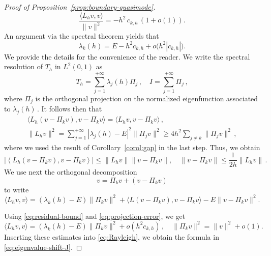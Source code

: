 \documentclass[11pt]{amsart}
\numberwithin{equation}{section}
\theoremstyle{remark}
\begin{document}
\begin{proof}[Proof of Proposition~\ref{prop:boundary-quasimode}]
    \begin{equation}\label{eq:Rayleigh}
    \frac{\langle L_hv,v\rangle}{\|v\|^2}=-h^2\,c_{k,h}\, (1+o(1)).
    \end{equation}
An argument via the spectral theorem yields that
\[\lambda_k(h)	=	E-h^2c_{k,h}	+o\bigl(h^2|c_{k,h}|\bigr).\]
%
%
We provide the details for the convenience of the reader.  We write the spectral resolution of $T_h$ in $L^2(0,1)$ as
\[T_h=\sum_{j=1}^{+\infty}\lambda_j(h)\Pi_j\,,\quad I=\sum_{j=1}^{+\infty}\Pi_j\,,\]
where $\Pi_j$ is the orthogonal projection on the normalized eigenfunction associated to $\lambda_j(h)\,$. It follows then that
\[\begin{gathered}
\langle L_h(v-\Pi_kv),v-\Pi_kv\rangle=\langle L_hv,v-\Pi_kv\rangle\,,\\
    \|L_hv\|^2=\sum_{j=1}^{+\infty}|\lambda_j(h)-E|^2\|\Pi_jv\|^2\geq 4h^2\sum_{j\not=k}\|\Pi_jv\|^2\,,
\end{gathered}\]
where we used the result of Corollary~\ref{corol:gap} in the last step. Thus, we obtain 
	\begin{equation}\label{eq:projection-error}
		\left|
		\left\langle
		L_h(v-\Pi_{k}v),
		v-\Pi_{k}v
		\right\rangle
		\right|\leq \|L_hv\|\|v-\Pi_kv\|,\quad 		\|v-\Pi_{k}v\|
		\le
		\frac{1}{2h}\|L_hv\|\,.
	\end{equation}
We use next the orthogonal decomposition
	\[
	v=\Pi_{k}v+(v-\Pi_{k}v)
	\]
to write
\[\langle L_hv,v\rangle=(\lambda_k(h)-E)\|\Pi_kv\|^2+\langle L(v-\Pi_kv),v-\Pi_kv\rangle-E\|v-\Pi_kv\|^2.\]

%
Using \eqref{eq:residual-bound} and \eqref{eq:projection-error}, we get
	\[
	\langle L_hv,v\rangle
	=
	(\lambda_k(h)-E)
	\|\Pi_{k}v\|^2
	+
	o(h^2c_{k,h})\,,\quad \|\Pi_kv\|^2=\|v\|^2+o(1).
	\]
%	
%
%
Inserting these estimates into \eqref{eq:Rayleigh}, we obtain the formula in \eqref{eq:eigenvalue-shift-J}.
\end{proof}
%
%
%
%
\end{document}
